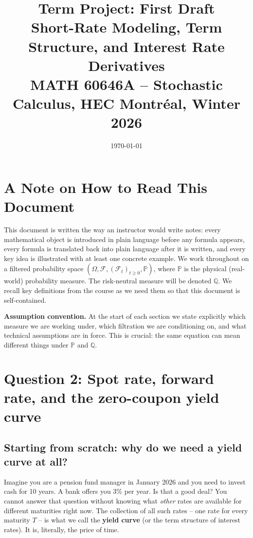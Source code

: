 \documentclass[11pt]{article}
\title{\textbf{Term Project: First Draft}\\
\large Short-Rate Modeling, Term Structure, and Interest Rate Derivatives\\
\normalsize MATH 60646A -- Stochastic Calculus, HEC Montr\'eal, Winter 2026}
\author{}
\date{\today}
\newcommand{\PP}{\mathbb{P}}
\newcommand{\QQ}{\mathbb{Q}}
\newcommand{\FF}{\mathcal{F}}
\begin{document}
\maketitle
\tableofcontents
\newpage

\section*{A Note on How to Read This Document}

This document is written the way an instructor would write notes: every
mathematical object is introduced in plain language before any formula
appears, every formula is translated back into plain language after it is
written, and every key idea is illustrated with at least one concrete
example.  We work throughout on a filtered probability space
$(\Omega,\FF,(\FF_t)_{t\ge 0},\PP)$, where $\PP$ is the physical
(real-world) probability measure.  The risk-neutral measure will be
denoted $\QQ$.  We recall key definitions from the course as we need them
so that this document is self-contained.

\textbf{Assumption convention.}  At the start of each section we state
explicitly which measure we are working under, which filtration we are
conditioning on, and what technical assumptions are in force.  This is
crucial: the same equation can mean different things under $\PP$ and $\QQ$.

\newpage
\section{Question 2: Spot rate, forward rate, and the zero-coupon yield curve}

\subsection{Starting from scratch: why do we need a yield curve at all?}

Imagine you are a pension fund manager in January 2026 and you need to
invest cash for 10 years.  A bank offers you $3\%$ per year.  Is that a
good deal?  You cannot answer that question without knowing what
\emph{other} rates are available for different maturities right now.  The
collection of all such rates -- one rate for every maturity $T$ -- is what
we call the \textbf{yield curve} (or the term structure of interest rates).
It is, literally, the price of time.
\end{document}
